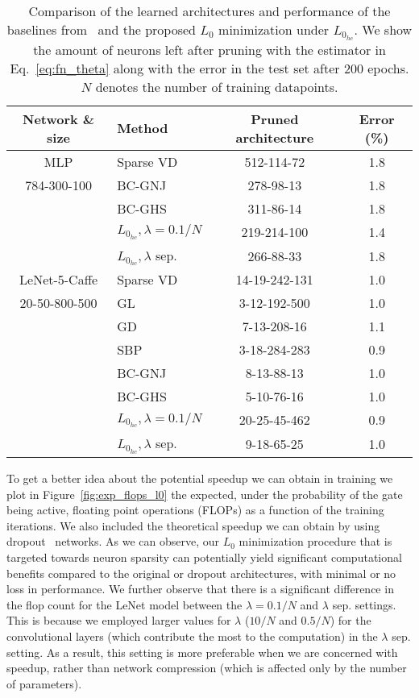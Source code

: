 \documentclass{article} %
\begin{document}
\begin{table}[hbt!]
	\centering 
	\caption{Comparison of the learned architectures and performance of the baselines from~\cite{louizos2017bayesian} and the proposed $L_0$ minimization under $L_{0_{hc}}$. We show the amount of neurons left after pruning with the estimator in Eq.~\ref{eq:fn_theta} along with the error in the test set after 200 epochs. $N$ denotes the number of training datapoints.}
	\label{tab:group_results}
	\begin{tabular}{clcc}
		\toprule 
		Network \& size & Method & Pruned architecture & Error (\%)\\
		\midrule
		MLP & Sparse VD~\citep{molchanov2017variational} & 512-114-72 & 1.8\\
		784-300-100 & BC-GNJ~\citep{louizos2017bayesian} & 278-98-13 & 1.8\\
		& BC-GHS~\citep{louizos2017bayesian} & 311-86-14 & 1.8\\
		\cmidrule{2-4}
		& $L_{0_{hc}}, \lambda = 0.1/N$ & 219-214-100 & 1.4 \\
		& $L_{0_{hc}}, \lambda$ sep. & 266-88-33 & 1.8 \\
		\midrule 
		LeNet-5-Caffe & Sparse VD~\citep{molchanov2017variational} & 14-19-242-131 & 1.0\\
		20-50-800-500 & GL~\citep{wen2016learning} & 3-12-192-500 & 1.0\\
		              & GD~\citep{srinivas2016generalized} & 7-13-208-16 & 1.1\\
		& SBP~\citep{neklyudov2017structured} & 3-18-284-283 & 0.9\\
		& BC-GNJ~\citep{louizos2017bayesian} & 8-13-88-13 & 1.0\\
		& BC-GHS~\citep{louizos2017bayesian} & 5-10-76-16 & 1.0\\
		\cmidrule{2-4}
		& $L_{0_{hc}}, \lambda = 0.1/N$ & 20-25-45-462 & 0.9 \\
		& $L_{0_{hc}}, \lambda $ sep. & 9-18-65-25 & 1.0 \\
		\bottomrule
	\end{tabular}
\end{table}

To get a better idea about the potential speedup we can obtain in training we plot in Figure~\ref{fig:exp_flops_l0} the expected, under the probability of the gate being active, floating point operations (FLOPs) as a function of the training iterations. We also included the theoretical speedup we can obtain by using dropout~\citep{srivastava2014dropout} networks. As we can observe, our $L_0$ minimization procedure that is targeted towards neuron sparsity can potentially yield significant computational benefits compared to the original or dropout architectures, with minimal or no loss in performance. We further observe that there is a significant difference in the flop count for the LeNet model between the $\lambda=0.1/N$ and $\lambda$ sep. settings. This is because we employed larger values for $\lambda$ ($10/N$ and $0.5/N$) for the convolutional layers (which contribute the most to the computation) in the $\lambda$ sep. setting. As a result, this setting is more preferable when we are concerned with speedup, rather than network compression (which is affected only by the number of parameters).
\end{document}
